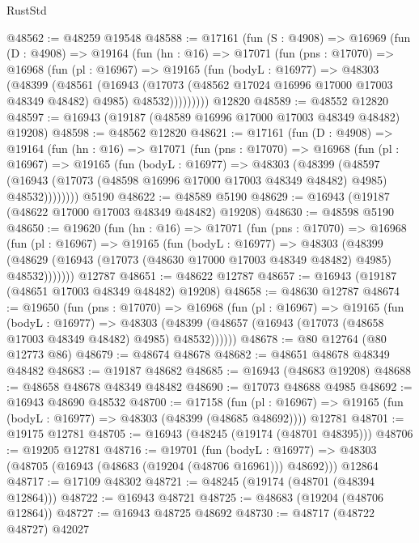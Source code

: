\begin{lexlean}{RustStd}
\begin{coremodule}
@48562 := @48259 @19548
@48588 := @17161
    (fun (S : @4908) =>
    @16969
      (fun (D : @4908) =>
      @19164
        (fun (hn : @16) =>
        @17071
          (fun (pns : @17070) =>
          @16968
            (fun (pl : @16967) =>
            @19165
              (fun (bodyL : @16977) =>
              @48303
                (@48399
                  (@48561
                    (@16943
                      (@17073 (@48562 @17024 @16996 @17000 @17003 @48349 @48482) @4985)
                      @48532)))))))))
    @12820
@48589 := @48552 @12820
@48597 := @16943 (@19187 (@48589 @16996 @17000 @17003 @48349 @48482) @19208)
@48598 := @48562 @12820
@48621 := @17161
    (fun (D : @4908) =>
    @19164
      (fun (hn : @16) =>
      @17071
        (fun (pns : @17070) =>
        @16968
          (fun (pl : @16967) =>
          @19165
            (fun (bodyL : @16977) =>
            @48303
              (@48399
                (@48597
                  (@16943 (@17073 (@48598 @16996 @17000 @17003 @48349 @48482) @4985) @48532))))))))
    @5190
@48622 := @48589 @5190
@48629 := @16943 (@19187 (@48622 @17000 @17003 @48349 @48482) @19208)
@48630 := @48598 @5190
@48650 := @19620
    (fun (hn : @16) =>
    @17071
      (fun (pns : @17070) =>
      @16968
        (fun (pl : @16967) =>
        @19165
          (fun (bodyL : @16977) =>
          @48303
            (@48399
              (@48629 (@16943 (@17073 (@48630 @17000 @17003 @48349 @48482) @4985) @48532)))))))
    @12787
@48651 := @48622 @12787
@48657 := @16943 (@19187 (@48651 @17003 @48349 @48482) @19208)
@48658 := @48630 @12787
@48674 := @19650
    (fun (pns : @17070) =>
    @16968
      (fun (pl : @16967) =>
      @19165
        (fun (bodyL : @16977) =>
        @48303 (@48399 (@48657 (@16943 (@17073 (@48658 @17003 @48349 @48482) @4985) @48532))))))
@48678 := @80 @12764 (@80 @12773 @86)
@48679 := @48674 @48678
@48682 := @48651 @48678 @48349 @48482
@48683 := @19187 @48682
@48685 := @16943 (@48683 @19208)
@48688 := @48658 @48678 @48349 @48482
@48690 := @17073 @48688 @4985
@48692 := @16943 @48690 @48532
@48700 := @17158
    (fun (pl : @16967) => @19165 (fun (bodyL : @16977) => @48303 (@48399 (@48685 @48692))))
    @12781
@48701 := @19175 @12781
@48705 := @16943 (@48245 (@19174 (@48701 @48395)))
@48706 := @19205 @12781
@48716 := @19701
    (fun (bodyL : @16977) => @48303 (@48705 (@16943 (@48683 (@19204 (@48706 @16961))) @48692)))
    @12864
@48717 := @17109 @48302
@48721 := @48245 (@19174 (@48701 (@48394 @12864)))
@48722 := @16943 @48721
@48725 := @48683 (@19204 (@48706 @12864))
@48727 := @16943 @48725 @48692
@48730 := @48717 (@48722 @48727) @42027

\end{coremodule}
\end{lexlean}
